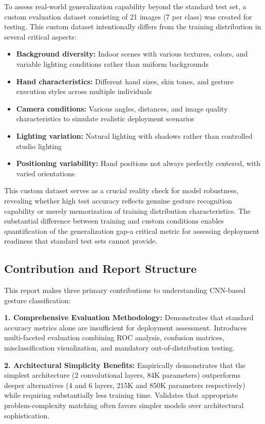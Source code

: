 \documentclass[12pt,a4paper]{article}
\begin{document}
To assess real-world generalization capability beyond the standard test set, a custom evaluation dataset consisting of 21 images (7 per class) was created for testing. This custom dataset intentionally differs from the training distribution in several critical aspects:

\begin{itemize}
    \item \textbf{Background diversity:} Indoor scenes with various textures, colors, and variable lighting conditions rather than uniform backgrounds
    \item \textbf{Hand characteristics:} Different hand sizes, skin tones, and gesture execution styles across multiple individuals
    \item \textbf{Camera conditions:} Various angles, distances, and image quality characteristics to simulate realistic deployment scenarios
    \item \textbf{Lighting variation:} Natural lighting with shadows rather than controlled studio lighting
    \item \textbf{Positioning variability:} Hand positions not always perfectly centered, with varied orientations
\end{itemize}

This custom dataset serves as a crucial reality check for model robustness, revealing whether high test accuracy reflects genuine gesture recognition capability or merely memorization of training distribution characteristics. The substantial difference between training and custom conditions enables quantification of the generalization gap-a critical metric for assessing deployment readiness that standard test sets cannot provide.

\subsection{Contribution and Report Structure}

This report makes three primary contributions to understanding CNN-based gesture classification:

\textbf{1. Comprehensive Evaluation Methodology:} Demonstrates that standard accuracy metrics alone are insufficient for deployment assessment. Introduces multi-faceted evaluation combining ROC analysis, confusion matrices, misclassification visualization, and mandatory out-of-distribution testing.

\textbf{2. Architectural Simplicity Benefits:} Empirically demonstrates that the simplest architecture (2 convolutional layers, 84K parameters) outperforms deeper alternatives (4 and 6 layers, 215K and 850K parameters respectively) while requiring substantially less training time. Validates that appropriate problem-complexity matching often favors simpler models over architectural sophistication.
\end{document}

